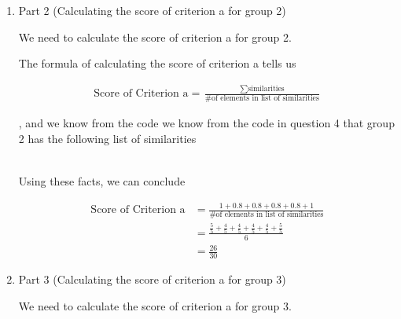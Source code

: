 \documentclass[12pt]{article}
\begin{document}
\begin{mdframed}
\begin{itemize}
\begin{enumerate}[1.]
\begin{mdframed}
            \end{mdframed}

            \item Part 2 (Calculating the score of criterion a for group 2)

            \begin{mdframed}

                We need to calculate the score of criterion a for group 2.

                \bigskip

                The formula of calculating the score of criterion a tells us

                \begin{align}
                    \text{Score of Criterion a} = \frac{\sum \text{similarities}}{\text{\# of elements in list of similarities}}
                \end{align}

                , and we know from the code we know from the code in question 4 that group 2 has the following
                list of similarities

                \begin{align}
                    [1,0.8,0.8,0.8,0.8,1]
                \end{align}

                \bigskip

                Using these facts, we can conclude

                \begin{align}
                    \text{Score of Criterion a} &= \frac{1 + 0.8 + 0.8 + 0.8 + 0.8 + 1}{\text{\# of elements in list of similarities}}\\
                    &= \frac{\frac{5}{5} + \frac{4}{5} + \frac{4}{5} + \frac{4}{5} + \frac{4}{5} + \frac{5}{5}}{6}\\
                    &= \frac{26}{30}
                \end{align}

            \end{mdframed}

            \item Part 3 (Calculating the score of criterion a for group 3)

            \begin{mdframed}

                We need to calculate the score of criterion a for group 3.

                \bigskip


\end{mdframed}
\end{enumerate}
\end{itemize}
\end{mdframed}
\end{document}
